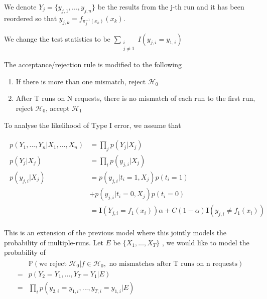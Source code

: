 \documentclass[]{article}
\begin{document}
We denote $Y_j = \{y_{j, 1}, 
..., y_{j, n}\}$ be the results from the j-th run and it has been reordered so 
that $y_{j, k} = f_{\pi_j^{-1}(x_k)}(x_k)$.

We change the test statistics to be $\sum_{\substack{i\\j\neq 1}} I(y_{j, i} = 
y_{1, i})$

The acceptance/rejection rule is modified to the following

\begin{enumerate}
    \item If there is more than one mismatch, reject $\mathcal{H}_0$
    \item After T runs on N requests, there is no mismatch of each run 
    to the first run, reject $\mathcal{H}_0$, accept $\mathcal{H}_1$
\end{enumerate}

To analyse the likelihood of Type I error, we assume that

\begin{align}
    \begin{split}
    p(Y_1, ..., Y_n | X_1, ... , X_n) &= \prod_{j}p(Y_j|X_j) \\
    p(Y_j | X_j) &= \prod_{i} p(y_{j, i} | X_j) \\
    p(y_{j, i} | X_j) &=  p(y_{j, i}| t_i = 
    1, X_j) p(t_i = 1) \\
    &+ p(y_{j, i} | t_i = 0, X_j) 
    p 
    (t_i = 0) \\
    &= \mathbf{I}(Y_{j, i} = f_1(x_i))\alpha + C(1 - 
    \alpha)\mathbf{I}(y_{j, i} \neq f_1(x_i))
    \end{split}
\end{align}

This is an extension of the previous model where this jointly models the 
probability of multiple-runs. Let $E$ be $\{X_1, ..., X_T\}$ , we would like to 
model the probability of 
\begin{align}
    \begin{split}
    &\mathbb{P}(\text{we reject } \mathcal{H}_0 | f\in\mathcal{H}_0, \text{ no 
    mismatches after T runs on n requests})\\
    =&p(Y_2 = Y_1, ..., Y_T =Y_1 | E)\\
    =&\prod_i p(y_{2, i} = y_{1, i}, ... , y_{T, i} = y_{1, i}| E)
    \end{split}
\end{align}
\end{document}
